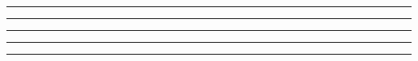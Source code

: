 
\begin{problem}{13.4}

\end{problem}

\begin{solution}


\end{solution}

\noindent\rule{7in}{1.5pt}


\begin{problem}{13.5}

\end{problem}

\begin{solution}


\end{solution}

\noindent\rule{7in}{1.5pt}


\begin{problem}{13.6}

\end{problem}

\begin{solution}


\end{solution}

\noindent\rule{7in}{1.5pt}


\begin{problem}{13.7}

\end{problem}

\begin{solution}


\end{solution}

\noindent\rule{7in}{1.5pt}


\begin{problem}{13.8}

\end{problem}

\begin{solution}


\end{solution}

\noindent\rule{7in}{1.5pt}

